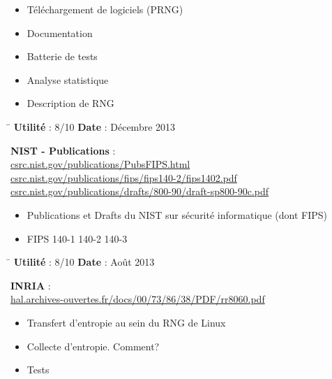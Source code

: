 \documentclass{article}
\begin{document}
	\begin{itemize}
		\item Téléchargement de logiciels (PRNG)
		\item Documentation
		\item Batterie de tests
		\item Analyse statistique
		\item Description de RNG
	\end{itemize}
	
	\begin{tabbing}
		\hspace{10cm}\=\kill
		\textbf{Utilité} : 8/10 \>	\textbf{Date} : Décembre 2013\\
	\end{tabbing}

	\textbf{NIST - Publications} :\\		
	\href{http://csrc.nist.gov/publications/PubsFIPS.html}
	{csrc.nist.gov/publications/PubsFIPS.html}\\
	\href{http://csrc.nist.gov/publications/fips/fips140-2/fips1402.pdf}
	{csrc.nist.gov/publications/fips/fips140-2/fips1402.pdf}\\
	\href{http://csrc.nist.gov/publications/drafts/800-90/draft-sp800-90c.pdf}
	{csrc.nist.gov/publications/drafts/800-90/draft-sp800-90c.pdf}\\

	\begin{itemize}
		\item Publications et Drafts du NIST sur sécurité informatique 
		(dont FIPS)
		\item FIPS 140-1 140-2 140-3
	\end{itemize}
	
	\begin{tabbing}
		\hspace{10cm}\=\kill
		\textbf{Utilité} : 8/10 \>	\textbf{Date} : Août 2013\\
	\end{tabbing}


	\textbf{INRIA} : \\
	\href{http://hal.archives-ouvertes.fr/docs/00/73/86/38/PDF/rr8060.pdf}
	{hal.archives-ouvertes.fr/docs/00/73/86/38/PDF/rr8060.pdf}\\

	\begin{itemize}
		\item Transfert d'entropie au sein du RNG de Linux
		\item Collecte d'entropie. Comment?
		\item Tests\\
	\end{itemize}
\end{document}
